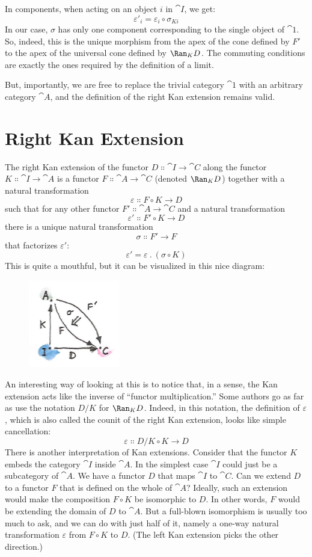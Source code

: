 \noindent
In components, when acting on an object $i$ in $\cat{I}$, we get:
\[\varepsilon'_i = \varepsilon_i \circ \sigma_{K i}\]
In our case, $\sigma$ has only one component corresponding to the
single object of $\cat{1}$. So, indeed, this is the unique morphism
from the apex of the cone defined by $F'$ to the apex of
the universal cone defined by $\Ran_{K}D$. The commuting conditions
are exactly the ones required by the definition of a limit.

But, importantly, we are free to replace the trivial category $\cat{1}$
with an arbitrary category $\cat{A}$, and the definition of the right Kan
extension remains valid.

\section{Right Kan Extension}

The right Kan extension of the functor $D \Colon \cat{I} \to \cat{C}$
along the functor $K \Colon \cat{I} \to \cat{A}$ is a functor
$F \Colon \cat{A} \to \cat{C}$ (denoted $\Ran_{K}D$) together with a
natural transformation
\[\varepsilon \Colon F \circ K \to D\]
such that for any other functor $F' \Colon \cat{A} \to \cat{C}$ and
a natural transformation
\[\varepsilon' \Colon F' \circ K \to D\]
there is a unique natural transformation
\[\sigma \Colon F' \to F\]
that factorizes $\varepsilon'$:
\[\varepsilon' = \varepsilon\ .\ (\sigma \circ K)\]
This is quite a mouthful, but it can be visualized in this nice diagram:

\begin{figure}[H]
\centering
\includegraphics[width=40mm]{images/kan7.jpg}
\end{figure}

\noindent
An interesting way of looking at this is to notice that, in a sense, the
Kan extension acts like the inverse of ``functor multiplication.'' Some
authors go as far as use the notation $D/K$ for $\Ran_{K}D$.
Indeed, in this notation, the definition of $\varepsilon$, which is also
called the counit of the right Kan extension, looks like simple
cancellation:
\[\varepsilon \Colon D/K \circ K \to D\]
There is another interpretation of Kan extensions. Consider that the
functor $K$ embeds the category $\cat{I}$ inside $\cat{A}$. In the
simplest case $\cat{I}$ could just be a subcategory of $\cat{A}$. We have
a functor $D$ that maps $\cat{I}$ to $\cat{C}$. Can we extend
$D$ to a functor $F$ that is defined on the whole of
$\cat{A}$? Ideally, such an extension would make the composition
$F \circ K$ be isomorphic to $D$. In other words, $F$
would be extending the domain of $D$ to $\cat{A}$. But a
full-blown isomorphism is usually too much to ask, and we can do with
just half of it, namely a one-way natural transformation $\varepsilon$ from
$F \circ K$ to $D$. (The left Kan extension picks the other direction.)


